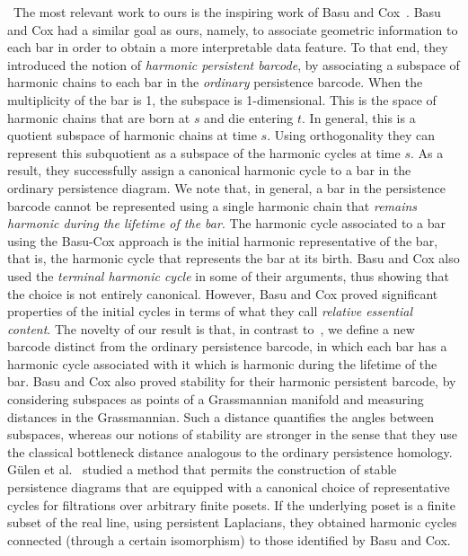 \documentclass[10pt,a4paper]{amsart}
\newcommand{\para}[1]{\vspace{2mm}\noindent{\textbf{\sffamily{#1}}}\hspace{4pt}}
\theoremstyle{definition}
\newcommand{\Bei}[1]{{\color{cyan}[#1]}}
\theoremstyle{remark}
\providecommand{\cal}{\mathcal}
\begin{document}
\para{Relation to the work of Basu and Cox.}~The most relevant work to ours is the inspiring work of Basu and Cox~\cite{BasuCox2022}. %
Basu and Cox had a similar goal as ours, namely, to associate geometric information to each bar in order to obtain a more interpretable data feature. To that end, they introduced the notion of \emph{harmonic persistent barcode}, by associating a subspace of harmonic chains to each bar in the \textit{ordinary} persistence barcode. When the multiplicity of the bar is 1, the subspace is 1-dimensional. %
This is the space of harmonic chains that are born at $s$ and die entering $t$. In general, this is a quotient subspace of harmonic chains at time $s$. Using orthogonality %
they can represent this subquotient as a subspace of the harmonic cycles at time $s$. As a result, they successfully assign a canonical harmonic cycle to a bar in the ordinary persistence diagram. We note that, in general, a bar in the persistence barcode cannot be represented using a single harmonic chain that \textit{remains harmonic during the lifetime of the bar}. The harmonic cycle associated to a bar using the Basu-Cox approach is the initial harmonic representative of the bar, that is, the harmonic cycle that represents the bar at its birth. Basu and Cox also used the \emph{terminal harmonic cycle} in some of their arguments, thus showing that the choice is not entirely canonical. However, Basu and Cox proved significant properties of the initial cycles in terms of what they call \emph{relative essential content}. The novelty of our result is that, in contrast to~\cite{BasuCox2022}, we define a new barcode distinct from the ordinary persistence barcode, in which each bar has a harmonic cycle associated with it which is harmonic during the lifetime of the bar. 
Basu and Cox also proved stability for their harmonic persistent barcode, by considering subspaces as points of a Grassmannian manifold and measuring distances in the Grassmannian. Such a distance quantifies the angles between subspaces, whereas our notions of stability are stronger in the sense that they use the classical bottleneck distance analogous to the ordinary persistence homology.
G\"{u}len et al.~\cite{GulenMemoliWan2024} studied a method that permits the construction of stable persistence diagrams that are equipped with a canonical choice of representative cycles for filtrations over arbitrary finite posets. If the underlying poset is a finite subset of the real line, using persistent Laplacians, they obtained harmonic cycles connected (through a certain isomorphism) to those identified by Basu and Cox. 
\end{document}
